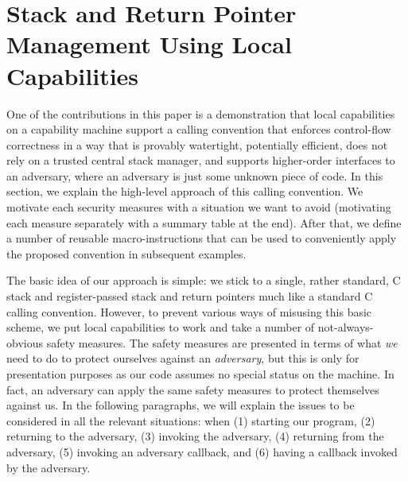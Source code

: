\documentclass[format=acmsmall, review=true, screen=true]{acmart}
\newcommand{\itoplassug}[1]{}
\begin{document}
\section{Stack and Return Pointer Management Using Local Capabilities}
\label{sec:stack-and-return-pointer}
\itoplassug{Suggestion: say something about arguments in this paragraph instead of defering it to the discussion only?\\}
\itoplassug{Suggestion: Add some of our presentation illustration figures to illustrate some of the issues? May not be feasible as they rely on ``animation''.\\}
\itoplassug{Suggestion: Include a description of (possibly definition for) well-bracketedness? (requested by reviewer C, popl). Reviewer D, popl, asks for the same but also a definition of local state encapsulation. In the POPL notes, I wrote that I talked with Lars about it and this is something that is not easily defined. Perhaps we should have a discussion of this.\\}
One of the contributions in this paper is a
demonstration that local capabilities on a capability machine support a calling
convention that enforces control-flow correctness in a way that is provably
watertight, potentially efficient, does not rely on a trusted central stack
manager, and supports higher-order interfaces to an adversary, where an adversary
is just some unknown piece of code. In this section, we explain the high-level
approach of this calling convention. We motivate each security measures with a
situation we want to avoid (motivating each measure separately with a summary table at the end).
After that, we define a number of reusable macro-instructions that can be used
to conveniently apply the proposed convention in subsequent examples.

The basic idea of our approach is simple: we stick to a single, rather standard,
C stack and register-passed stack and return pointers much like a standard C
calling convention. However, to prevent various ways of misusing this basic
scheme, we put local capabilities to work and take a number of
not-always-obvious safety measures. The safety measures are presented in terms
of what \emph{we} need to do to protect ourselves against an \emph{adversary},
but this is only for presentation purposes as our code assumes no special status on
the machine. In fact, an adversary can apply the same safety measures to protect
themselves against us. In the following paragraphs, we will explain the issues to be
considered in all the relevant situations: when (1) starting our program, (2)
returning to the adversary, (3) invoking the adversary, (4) returning from the
adversary, (5) invoking an adversary callback, and (6) having a callback invoked
by the adversary.
\end{document}
